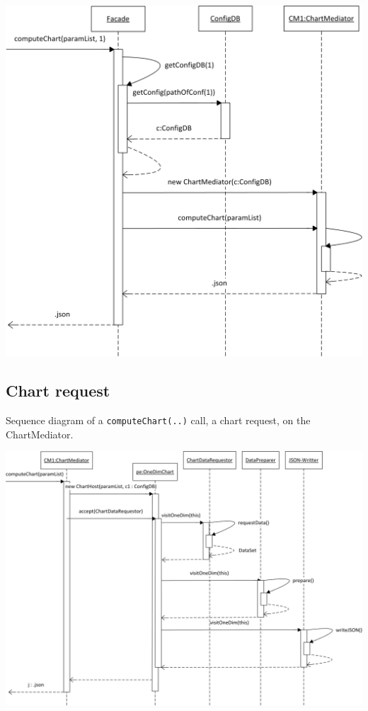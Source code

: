 \begin{center}
\includegraphics{Pictures/Seq/SeqFacade.png}  
\end{center} 
  


\newpage
\subsection{Chart request}
Sequence diagram of a \texttt{computeChart(..)} call, a chart request, on the ChartMediator.
 
\begin{center}
\includegraphics[width=1\linewidth]{Pictures/Seq/SeqChart.png}  
\end{center}
 
